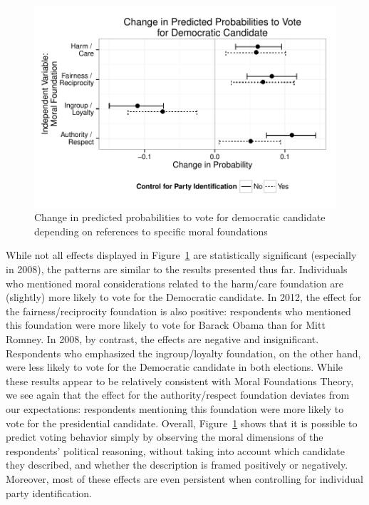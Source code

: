 \documentclass[12pt]{article}
\begin{document}
\begin{figure}[ht]\centering
\includegraphics{../calc/fig/fig8vote.pdf}
\caption{Change in predicted probabilities to vote for democratic candidate depending on references to specific moral foundations}\label{fig:8vote}
\end{figure}

While not all effects displayed in Figure~\ref{fig:8vote} are statistically significant (especially in 2008), the patterns are similar to the results presented thus far. Individuals who mentioned moral considerations related to the harm/care foundation are (slightly) more likely to vote for the Democratic candidate. In 2012, the effect for the fairness/reciprocity foundation is also positive: respondents who mentioned this foundation were more likely to vote for Barack Obama than for Mitt Romney. In 2008, by contrast, the effects are negative and insignificant. Respondents who emphasized the ingroup/loyalty foundation, on the other hand, were less likely to vote for the Democratic candidate in both elections. While these results appear to be relatively consistent with Moral Foundations Theory, we see again that the effect for the authority/respect foundation deviates from our expectations: respondents mentioning this foundation were more likely to vote for the presidential candidate. Overall, Figure~\ref{fig:8vote} shows that it is possible to predict voting behavior simply by observing the moral dimensions of the respondents' political reasoning, without taking into account which candidate they described, and whether the description is framed positively or negatively. Moreover, most of these effects are even persistent when controlling for individual party identification.
\end{document}
